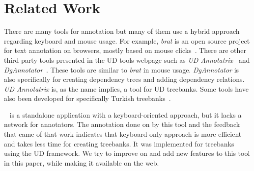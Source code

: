 \section{Related Work}
\label{sec:related}

There are many tools for annotation but many of them use a hybrid approach regarding keyboard and mouse usage.
For example, \textit{brat} is an open source project for text annotation on browsers, mostly based on mouse clicks~\cite{brat,UD}.
There are other third-party tools presented in the UD tools webpage such as \textit{UD Annotatrix}~\cite{tyers-etal:2018} and \textit{DgAnnotator}~\cite{dgannotator}.
These tools are similar to \textit{brat} in mouse usage.
\textit{DgAnnotator} is also specifically for creating dependency trees and adding dependency relations.
\textit{UD Annotatrix} is, as the name implies, a tool for UD treebanks.
Some tools have also been developed for specifically Turkish treebanks~\cite{turk-etal-2019-turkish}.

\boatvone~\cite{turk-etal-2019-turkish} is a standalone application with a keyboard-oriented approach, but it lacks a network for annotators.
The annotation done on \bountreebank{} by this tool and the feedback that came of that work indicates that keyboard-only approach is more efficient and takes less time for creating treebanks.
It was implemented for treebanks using the UD framework.
We try to improve on and add new features to this tool in this paper, while making it available on the web.
